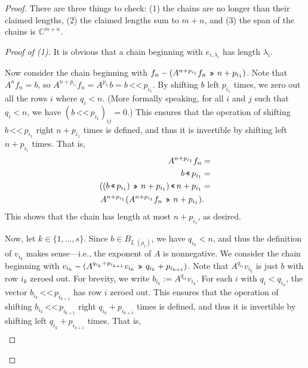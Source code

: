 \documentclass[12pt,psamsfonts]{article}
\newcommand{\leftshift}{\,\texttt{<<}\,}
\newcommand{\rightshift}{\mathbin{\rotatebox[origin=c]{180}{\leftshift}}}
\begin{document}
\begin{proof}
    There are three things to check: (1) the chains are no longer than their claimed lengths, (2) the claimed lengths sum to \(m + n\), and (3) the span of the chains is \(\mathbb{C}^{m + n}\).
    \begin{proof}[Proof of (1)]
        It is obvious that a chain beginning with \(e_{i, \lambda_i}\) has length \(\lambda_i\).
        \par Now consider the chain beginning with \(f_n - (A^{n + p_{i_1}} f_n \rightshift n + p_{i_1})\).
        Note that \(A^n f_n = b\), so \(A^{n + p_{i_1}} f_n = A^{p_{i_1}} b = b \leftshift p_{i_1}\).
        By shifting \(b\) left \(p_{i_1}\) times, we zero out all the rows \(i\) where \(q_i < n\).
        (More formally speaking, for all \(i\) and \(j\) such that \(q_i < n\), we have \((b \leftshift p_{i_1})_{ij} = 0\).)
        This ensures that the operation of shifting \(b \leftshift p_{i_1}\) right \(n + p_{i_1}\) times is defined, and thus it is invertible by shifting left \(n + p_{i_1}\) times.
        That is,
        \begin{align*}
            A^{n + p_{i_1}} f_n & = \\
            b \leftshift p_{i_1} & = \\
            ((b \leftshift p_{i_1}) \rightshift n + p_{i_1}) \leftshift n + p_{i_1} & = \\
            A^{n + p_{i_1}}(A^{n + p_{i_1}}f_n \rightshift n + p_{i_1}) & .
        \end{align*}
        This shows that the chain has length at most \(n + p_{i_1}\), as desired.
        \par Now, let \(k \in \{1, ..., s\}\).
        Since \(b \in B_{I, (\rho_i)}\), we have \(q_{i_k} < n\), and thus the definition of \(v_{i_k}\) makes sense---i.e., the exponent of \(A\) is nonnegative.
        We consider the chain beginning with \(v_{i_k} - (A^{q_{i_k} + p_{i_{k + 1}}} v_{i_k} \rightshift q_{i_k} + p_{i_{k + 1}})\).
        Note that \(A^{q_{i_k}} v_{i_k}\) is just \(b\) with row \(i_k\) zeroed out.
        For brevity, we write \(b_{i_k} := A^{q_{i_k}} v_{i_k}\).
        For each \(i\) with \(q_i < q_{i_k}\), the vector \(b_{i_k} \leftshift p_{i_{k + 1}}\) has row \(i\) zeroed out.
        This ensures that the operation of shifting \(b_{i_k} \leftshift p_{i_{k + 1}}\) right \(q_{i_k} + p_{i_{k + 1}}\) times is defined, and thus it is invertible by shifting left \(q_{i_k} + p_{i_{k + 1}}\) times.
        That is,
        \begin{align*}

\end{align*}
\end{proof}
\end{proof}
\end{document}

